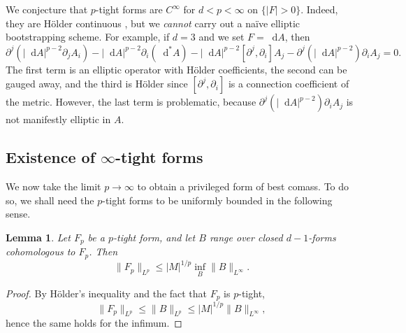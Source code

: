 \documentclass[reqno,11pt]{amsart}
\newcommand*\dif{\mathop{}\!\mathrm{d}}
\newtheorem{lemma}[theorem]{Lemma}
\theoremstyle{definition}
\numberwithin{equation}{section}
\begin{document}
We conjecture that $p$-tight forms are $C^\infty$ for $d < p < \infty$ on $\{|F| > 0\}$.
Indeed, they are H\"older continuous \cite{Uhlenbeck77}, but we \emph{cannot} carry out a na\"ive elliptic bootstrapping scheme.
For example, if $d = 3$ and we set $F = \dif A$, then
$$\partial^j(|\dif A|^{p - 2} \partial_j A_i) - |\dif A|^{p - 2} \partial_i (\dif^* A) - |\dif A|^{p - 2} [\partial^j, \partial_i] A_j - \partial^j(|\dif A|^{p - 2}) \partial_i A_j = 0.$$
The first term is an elliptic operator with H\"older coefficients, the second can be gauged away, and the third is H\"older since $[\partial^j, \partial_i]$ is a connection coefficient of the metric.
However, the last term is problematic, because $\partial^j(|\dif A|^{p - 2}) \partial_i A_j$ is not manifestly elliptic in $A$.


\subsection{\texorpdfstring{Existence of $\infty$-tight forms}{Existence of infinity-tight forms}}
We now take the limit $p \to \infty$ to obtain a privileged form of best comass.
To do so, we shall need the $p$-tight forms to be uniformly bounded in the following sense.

\begin{lemma}
Let $F_p$ be a $p$-tight form, and let $B$ range over closed $d - 1$-forms cohomologous to $F_p$. Then
\begin{equation}\label{infinity magnetic rules p magnetic}
	\|F_p\|_{L^p} \leq |M|^{1/p} \inf_B \|B\|_{L^\infty}.
\end{equation}
\end{lemma}
\begin{proof}
By H\"older's inequality and the fact that $F_p$ is $p$-tight,
$$\|F_p\|_{L^p} \leq \|B\|_{L^p} \leq |M|^{1/p} \|B\|_{L^\infty},$$
hence the same holds for the infimum.
\end{proof}
\end{document}
